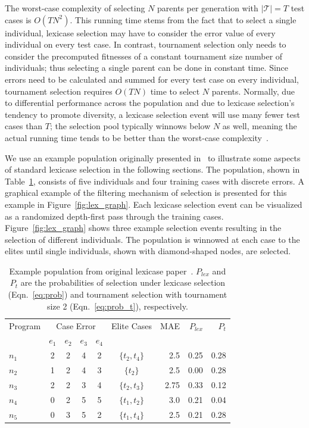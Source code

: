 \documentclass[twoside]{article}
\begin{document}
The worst-case complexity of selecting $N$ parents per generation with $|\mathcal{T}| = T$ test cases is $O(TN^2)$. This running time stems from the fact that to select a single individual, lexicase selection may have to consider the error value of every individual on every test case.
In contrast, tournament selection only needs to consider the precomputed fitnesses of a constant tournament size number of individuals; thus selecting a single parent can be done in constant time. Since errors need to be calculated and summed for every test case on every individual, tournament selection requires $O(TN)$ time to select $N$ parents.
Normally, due to differential performance across the population and due to lexicase selection's tendency to promote diversity, a lexicase selection event will use many fewer test cases than $T$; the selection pool typically winnows below $N$ as well, meaning the actual running time tends to be better than the worst-case complexity~\citep{helmuth_solving_2014, la_cava_epsilon-lexicase_2016}. 

We use an example population originally presented in~\citep{spector_assessment_2012} to illustrate some aspects of standard lexicase selection in the following sections. The population, shown in Table~\ref{tbl:ex}, consists of five individuals and four training cases with discrete errors. A graphical example of the filtering mechanism of selection is presented for this example in Figure~\ref{fig:lex_graph}. Each lexicase selection event can be visualized as a randomized depth-first pass through the training cases. Figure~\ref{fig:lex_graph} shows three example selection events resulting in the selection of different individuals. The population is winnowed at each case to the elites until single individuals, shown with diamond-shaped nodes, are selected. 

\begin{table}
\centering
\caption{Example population from original lexicase paper~\citep{spector_assessment_2012}. $P_{lex}$ and $P_t$ are the probabilities of selection under lexicase selection (Eqn.~\ref{eq:prob}) and tournament selection with tournament size 2 (Eqn.~\ref{eq:prob_t}), respectively.}\label{tbl:ex}
\begin{tabular}{l|cccc|c|r|rr}\toprule
Program & \multicolumn{4}{c}{Case Error} & Elite Cases & MAE & $P_{lex}$ & $P_{t}$\\
& $e_1$ & $e_2$ & $e_3$ & $e_4$ & \\ \midrule
$n_1$ & 2 & 2 & 4 & 2 & $\{t_2,t_4\}$ &	2.5		&	0.25 	& 	0.28	\\
$n_2$ & 1 & 2 & 4 & 3 & $\{t_2\}$		&	2.5		&	0.00	&	0.28	\\
$n_3$ & 2 & 2 & 3 & 4 & $\{t_2,t_3\}$ &	2.75	& 	0.33	&	0.12	\\
$n_4$ & 0 & 2 & 5 & 5 & $\{t_1,t_2\}$ &	3.0		& 	0.21	&	0.04	\\
$n_5$ & 0 & 3 & 5 & 2 & $\{t_1,t_4\}$ &	2.5		&	0.21	&	0.28	\\ \bottomrule
\end{tabular}
\end{table}
\end{document}
